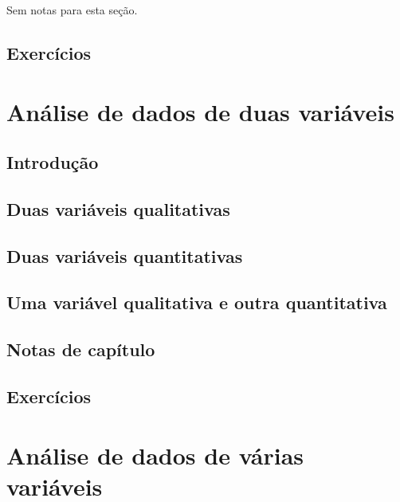 \documentclass[
]{latex/krantz}
\theoremstyle{definition}
\theoremstyle{definition}
\theoremstyle{definition}
\theoremstyle{definition}
\theoremstyle{remark}
\begin{document}
Sem notas para esta seção.

\hypertarget{exercuxedcios-1}{%
\section{Exercícios}\label{exercuxedcios-1}}

\hypertarget{anuxe1lise-de-dados-de-duas-variuxe1veis}{%
\chapter{Análise de dados de duas variáveis}\label{anuxe1lise-de-dados-de-duas-variuxe1veis}}

\hypertarget{introduuxe7uxe3o-2}{%
\section{Introdução}\label{introduuxe7uxe3o-2}}

\hypertarget{duas-variuxe1veis-qualitativas}{%
\section{Duas variáveis qualitativas}\label{duas-variuxe1veis-qualitativas}}

\hypertarget{duas-variuxe1veis-quantitativas}{%
\section{Duas variáveis quantitativas}\label{duas-variuxe1veis-quantitativas}}

\hypertarget{uma-variuxe1vel-qualitativa-e-outra-quantitativa}{%
\section{Uma variável qualitativa e outra quantitativa}\label{uma-variuxe1vel-qualitativa-e-outra-quantitativa}}

\hypertarget{notas-de-capuxedtulo-2}{%
\section{Notas de capítulo}\label{notas-de-capuxedtulo-2}}

\hypertarget{exercuxedcios-2}{%
\section{Exercícios}\label{exercuxedcios-2}}

\hypertarget{anuxe1lise-de-dados-de-vuxe1rias-variuxe1veis}{%
\chapter{Análise de dados de várias variáveis}\label{anuxe1lise-de-dados-de-vuxe1rias-variuxe1veis}}
\end{document}
